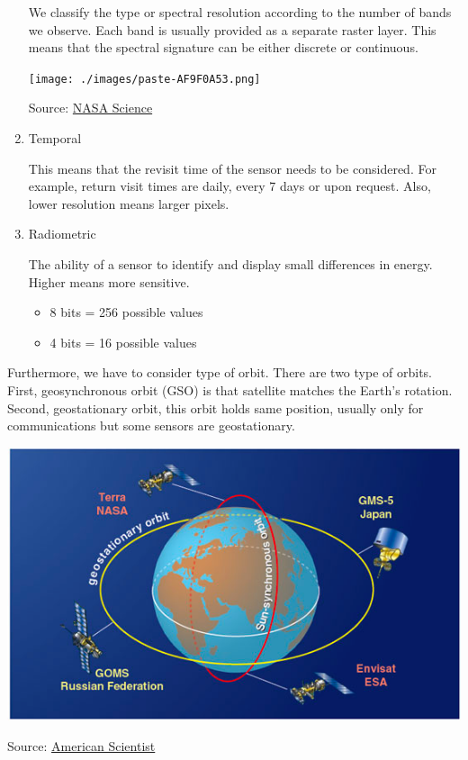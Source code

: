 \documentclass[
  letterpaper,
  DIV=11,
  numbers=noendperiod]{scrreprt}
\begin{document}
\begin{enumerate}
  We classify the type or spectral resolution according to the number of
  bands we observe. Each band is usually provided as a separate raster
  layer. This means that the spectral signature can be either discrete
  or continuous.

  \texttt{[image: ./images/paste-AF9F0A53.png]}

  Source:
  \href{https://earthdata.nasa.gov/learn/backgrounders/remote-sensing\#orbits}{NASA
  Science}
\item
  Temporal

  This means that the revisit time of the sensor needs to be considered.
  For example, return visit times are daily, every 7 days or upon
  request. Also, lower resolution means larger pixels.
\item
  Radiometric

  The ability of a sensor to identify and display small differences in
  energy. Higher means more sensitive.

  \begin{itemize}
  \item
    8 bits = 256 possible values
  \item
    4 bits = 16 possible values
  \end{itemize}
\end{enumerate}

Furthermore, we have to consider type of orbit. There are two type of
orbits. First, geosynchronous orbit (GSO) is that satellite matches the
Earth's rotation. Second, geostationary orbit, this orbit holds same
position, usually only for communications but some sensors are
geostationary.

\includegraphics{./images/paste-45BCDEA4.png}

Source:
\href{https://www.americanscientist.org/article/fifty-years-of-earth-observation-satellites}{American
Scientist}
\end{document}

